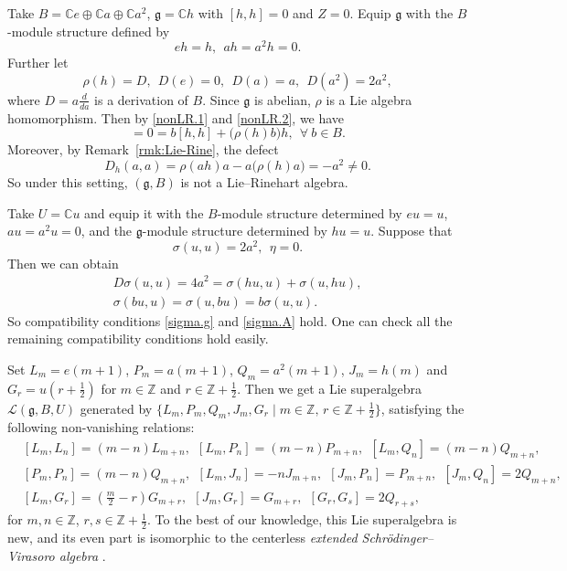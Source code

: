 \documentclass[12pt]{article}
\numberwithin{equation}{section}
\theoremstyle{definition}
\theoremstyle{plain}
\newcommand{\bC}{\ensuremath{\mathbb{C}}}
\newcommand{\bZ}{\ensuremath{\mathbb{Z}}}
\newcommand{\fg}{\mathfrak{g}}
\newcommand{\cL}{\ensuremath{\mathcal{L}}}
\begin{document}
Take $B=\bC e\oplus\bC a\oplus\bC a^2$, $\fg=\bC h$ with $[h,h]=0$ and $Z=0$. Equip $\fg$ with the $B$-module structure defined by
\begin{equation}\label{nonLR.1}
    eh=h,\ \ ah=a^2h=0.
\end{equation}
Further let 
\begin{equation}\label{nonLR.2}
    \rho(h)=D,\ \ D(e)=0,\ \ D(a)=a,\ \ D(a^2)=2a^2,
\end{equation}
where $D=a\frac{d}{da}$ is a derivation of $B$. Since $\fg$ is abelian, $\rho$ is a Lie algebra homomorphism. Then by \eqref{nonLR.1} and \eqref{nonLR.2}, we have
\begin{equation*}
    [h,bh]=0=b[h,h]+\big(\rho(h)b\big)h,\ \ \forall\ b\in B.
\end{equation*}
Moreover, by Remark~\ref{rmk:Lie-Rine}, the defect
\begin{equation*}
    D_h(a,a)=\rho(ah)a-a\big(\rho(h)a\big)=-a^2\neq0.
\end{equation*}
So under this setting, $(\fg,B)$ is not a Lie--Rinehart algebra.

Take $U=\bC u$ and equip it with the $B$-module structure determined by $eu=u$, $au=a^2u=0$, and the $\fg$-module structure determined by $hu=u$. Suppose that
\begin{equation*}
    \sigma(u,u)=2a^2,\ \ \eta=0.
\end{equation*}
Then we can obtain
\begin{gather*}
    D\sigma(u,u)=4a^2=\sigma(hu,u)+\sigma(u,hu),\\
    \sigma(bu,u)=\sigma(u,bu)=b  \sigma(u,u).
\end{gather*}
So compatibility conditions \eqref{sigma.g} and \eqref{sigma.A} hold. One can check all the remaining compatibility conditions hold easily.

Set $L_m=e(m+1)$, $P_m=a(m+1)$, $Q_m=a^2(m+1)$, $J_m=h(m)$ and $G_r=u(r+\frac{1}{2})$ for $m\in\bZ$ and $r\in\bZ+\frac{1}{2}$. Then we get a Lie superalgebra $\cL(\fg,B,U)$ generated by $\{L_m,P_m,Q_m,J_m,G_r\mid m\in\bZ,\,r\in\bZ+\frac{1}{2}\}$, satisfying the following non-vanishing relations:
\begin{align*}
    &[L_m,L_n]=(m-n)L_{m+n},\ \ [L_m,P_n]=(m-n)P_{m+n},\ \ [L_m,Q_n]=(m-n)Q_{m+n},\\
    &[P_m,P_n]=(m-n)Q_{m+n},\ \ [L_m,J_n]=-nJ_{m+n},\ \ [J_m,P_n]=P_{m+n},\ \ [J_m,Q_n]=2Q_{m+n},\\
    &[L_m,G_r]=(\frac{m}{2}-r)G_{m+r},\ \ [J_m,G_r]=G_{m+r},\ \ [G_r,G_s]=2Q_{r+s},
\end{align*}
for $m,n\in\bZ$, $r,s\in\bZ+\frac{1}{2}$. To the best of our knowledge, this Lie superalgebra is new, and its even part is isomorphic to the centerless \emph{extended Schrödinger--Virasoro algebra} \cite{U}.
\end{document}
